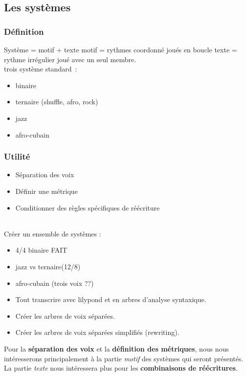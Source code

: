 \subsection{Les systèmes}
\subsubsection{Définition}

Système = motif + texte
motif = rythmes coordonné joués en boucle
texte = rythme irrégulier joué avec un seul membre.\\

trois système standard :
\begin{itemize}
	\item binaire
	\item ternaire (shuffle, afro, rock)
	\item jazz
	\item afro-cubain
\end{itemize}

\subsubsection{Utilité}
\begin{itemize}
	\item Séparation des voix
	\item Définir une métrique
	\item Conditionner des règles spécifiques de réécriture
\end{itemize}
\ \\
Créer un ensemble de systèmes :
\begin{itemize}
	\item 4/4 binaire FAIT
	\item jazz vs ternaire(12/8)
	\item afro-cubain (trois voix ??)
	\item Tout transcrire avec lilypond et en arbres d’analyse syntaxique.
	\item Créer les arbres de voix séparées.
	\item Créer les arbres de voix séparées simplifiés (rewriting).\\	
\end{itemize}

Pour la \textbf{séparation des voix} et la \textbf{définition des métriques}, nous nous intéresserons principalement à la partie \textit{motif} des systèmes qui seront présentés. La partie \textit{texte} nous intéressera plus pour les \textbf{combinaisons de réécritures}.
\newpage

